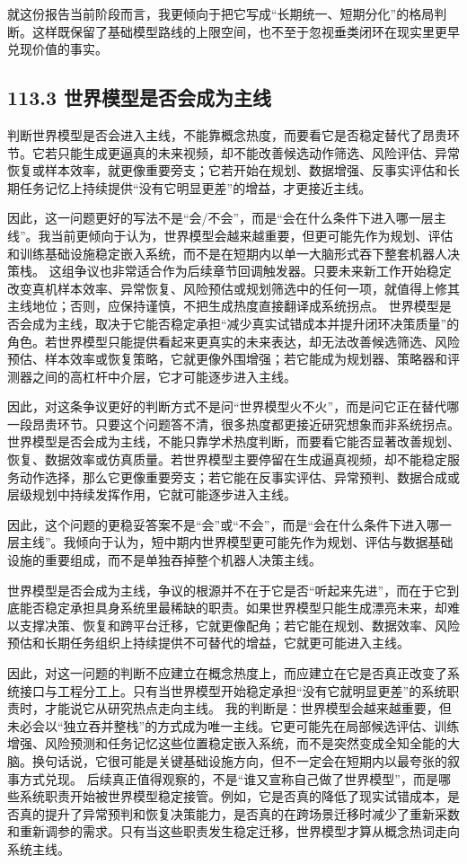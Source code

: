 就这份报告当前阶段而言，我更倾向于把它写成“长期统一、短期分化”的格局判断。这样既保留了基础模型路线的上限空间，也不至于忽视垂类闭环在现实里更早兑现价值的事实。

\subsection*{113.3 世界模型是否会成为主线}


判断世界模型是否会进入主线，不能靠概念热度，而要看它是否稳定替代了昂贵环节。它若只能生成更逼真的未来视频，却不能改善候选动作筛选、风险评估、异常恢复或样本效率，就更像重要旁支；它若开始在规划、数据增强、反事实评估和长期任务记忆上持续提供“没有它明显更差”的增益，才更接近主线。

因此，这一问题更好的写法不是“会/不会”，而是“会在什么条件下进入哪一层主线”。我当前更倾向于认为，世界模型会越来越重要，但更可能先作为规划、评估和训练基础设施稳定嵌入系统，而不是在短期内以单一大脑形式吞下整套机器人决策栈。 这组争议也非常适合作为后续章节回调触发器。只要未来新工作开始稳定改变真机样本效率、异常恢复、风险预估或规划筛选中的任何一项，就值得上修其主线地位；否则，应保持谨慎，不把生成热度直接翻译成系统拐点。 世界模型是否会成为主线，取决于它能否稳定承担“减少真实试错成本并提升闭环决策质量”的角色。若世界模型只能提供看起来更真实的未来表达，却无法改善候选筛选、风险预估、样本效率或恢复策略，它就更像外围增强；若它能成为规划器、策略器和评测器之间的高杠杆中介层，它才可能逐步进入主线。

因此，对这条争议更好的判断方式不是问“世界模型火不火”，而是问它正在替代哪一段昂贵环节。只要这个问题答不清，很多热度都更接近研究想象而非系统拐点。 世界模型是否会成为主线，不能只靠学术热度判断，而要看它能否显著改善规划、恢复、数据效率或仿真质量。若世界模型主要停留在生成逼真视频，却不能稳定服务动作选择，那么它更像重要旁支；若它能在反事实评估、异常预判、数据合成或层级规划中持续发挥作用，它就可能逐步进入主线。

因此，这个问题的更稳妥答案不是“会”或“不会”，而是“会在什么条件下进入哪一层主线”。我倾向于认为，短中期内世界模型更可能先作为规划、评估与数据基础设施的重要组成，而不是单独吞掉整个机器人决策主线。

世界模型是否会成为主线，争议的根源并不在于它是否“听起来先进”，而在于它到底能否稳定承担具身系统里最稀缺的职责。如果世界模型只能生成漂亮未来，却难以支撑决策、恢复和跨平台迁移，它就更像配角；若它能在规划、数据效率、风险预估和长期任务组织上持续提供不可替代的增益，它就更可能进入主线。

因此，对这一问题的判断不应建立在概念热度上，而应建立在它是否真正改变了系统接口与工程分工上。只有当世界模型开始稳定承担“没有它就明显更差”的系统职责时，才能说它从研究热点走向主线。 我的判断是：世界模型会越来越重要，但未必会以“独立吞并整栈”的方式成为唯一主线。它更可能先在局部候选评估、训练增强、风险预测和任务记忆这些位置稳定嵌入系统，而不是突然变成全知全能的大脑。换句话说，它很可能是关键基础设施方向，但不一定会在短期内以最夸张的叙事方式兑现。 后续真正值得观察的，不是“谁又宣称自己做了世界模型”，而是哪些系统职责开始被世界模型稳定接管。例如，它是否真的降低了现实试错成本，是否真的提升了异常预判和恢复决策能力，是否真的在跨场景迁移时减少了重新采数和重新调参的需求。只有当这些职责发生稳定迁移，世界模型才算从概念热词走向系统主线。


